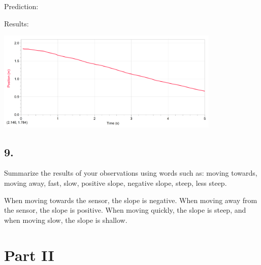    \begin{mdframed}
        \centering Prediction:


        Results:

        \centering\includegraphics[width=0.8\textwidth]{image20.png}
    \end{mdframed}

    \subsection*{9.}
    Summarize the results of your observations using words such as: moving towards, moving away, fast, slow, positive slope, negative slope, steep, less steep.

    \begin{mdframed}
        When moving towards the sensor, the slope is negative. When moving away from the sensor, the slope is positive. When moving quickly, the slope is steep, and when moving slow, the slope is shallow.
    \end{mdframed}

    \section*{Part II}

